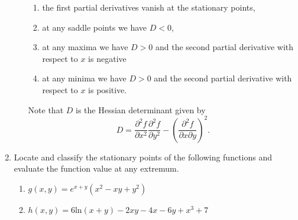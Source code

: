 \documentclass[20pt, a4paper]{extarticle}
\begin{document}
\begin{enumerate}
\begin{enumerate}
    \begin{enumerate}
    \item
    the first partial derivatives vanish at the stationary points,
    \item at any saddle points we have $D < 0$,
    \item
    at any maxima we have $D > 0$ and the second partial derivative with respect to $x$ is negative
    \item
    at any minima we have $D > 0$ and the second partial derivative with respect to $x$ is positive.
    \end{enumerate}
    Note that $D$ is the Hessian determinant given by 
    $$D= \frac{\partial^2 f}{\partial x^2}\frac{\partial^2 f}{\partial y^2} - \left ( \frac{\partial^2 f}{\partial x \partial y}\right )^2 .$$
    \end{enumerate}
    \item
    Locate and classify the stationary points of the following functions and evaluate the function value at any extremum.
    \begin{enumerate}
    \item
    $g(x,y)=e^{x+y} ( x^2 - xy + y^2)$
    \item
    $h(x,y) = 6 \text{ln} (x+y) - 2xy -4 x - 6y + x^3 + 7$
    \end{enumerate}
    \end{enumerate}
\end{document}
